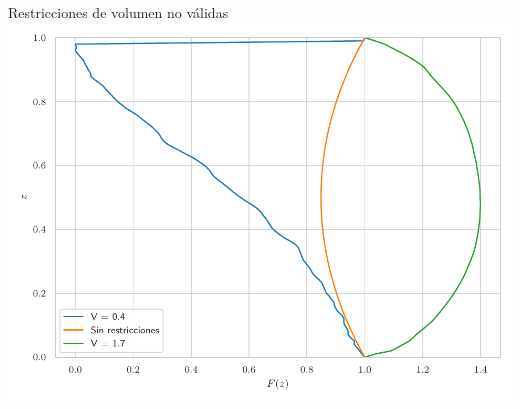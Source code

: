 \documentclass[11pt]{beamer}
\begin{document}
            \begin{frame}{Restricciones de volumen no válidas}
                \centering
                \includegraphics[width = 0.8 \linewidth]{Figuras/vol_no_sol_n100.pdf}
            \end{frame}
		
	
\end{document}
